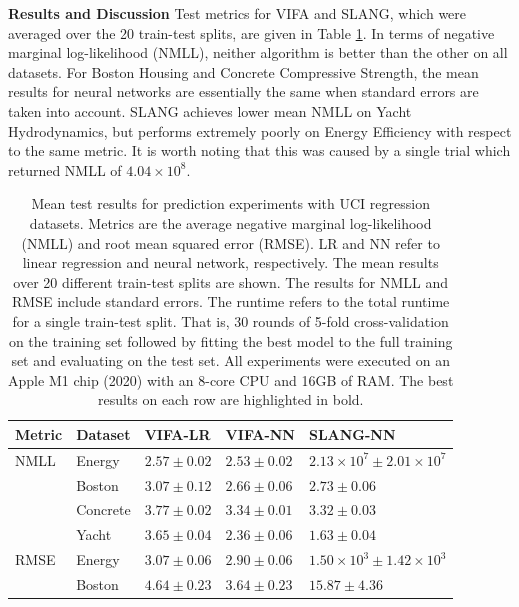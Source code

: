 \documentclass[10pt]{article} %
\begin{document}
\textbf{ Results and Discussion} Test metrics for VIFA and SLANG, which were averaged over the 20 train-test splits, are given in Table \ref{table:neural_nets_uci_mean}. In terms of negative marginal log-likelihood (NMLL), neither algorithm is better than the other on all datasets. For Boston Housing and Concrete Compressive Strength, the mean results for neural networks are essentially the same when standard errors are taken into account. SLANG achieves lower mean NMLL on Yacht Hydrodynamics, but performs extremely poorly on Energy Efficiency with respect to the same metric. It is worth noting that this was caused by a single trial which returned NMLL of $4.04 \times 10^{8}$. 

\begin{table}[!h]
\caption{Mean test results for prediction experiments with UCI regression datasets. Metrics are the average negative marginal log-likelihood (NMLL) and root mean squared error (RMSE). LR and NN refer to linear regression and neural network, respectively. The  mean results over 20 different train-test splits are shown. The results for NMLL and RMSE include standard errors. The runtime refers to the total runtime for a single train-test split. That is, 30 rounds of 5-fold cross-validation on the training set followed by fitting the best model to the full training set and evaluating on the test set. All experiments were executed on an Apple M1 chip (2020) with an 8-core CPU and 16GB of RAM. The best results on each row are highlighted in bold.}
\label{table:neural_nets_uci_mean}
\begin{center}
\begin{tabular}{lllll}
\textbf{Metric}  & \textbf{Dataset}  & \textbf{VIFA-LR} & \textbf{VIFA-NN} & \textbf{SLANG-NN} \\ \hline
NMLL 	& Energy 		& $\mathbf{2.57 \pm 0.02}$ 	& $\mathbf{2.53 \pm            0.02}$ 	& $2.13 \times 10^{7} \pm 2.01 \times 10^{7}$ \\ 	
		& Boston   	& $3.07 \pm 0.12$			& $\mathbf{2.66 \pm 0.06}$ 	& $\mathbf{2.73 \pm 0.06}$ \\ 			
		& Concrete	& $3.77 \pm 0.02$ 			& $\mathbf{3.34 \pm 0.01}$ 	& $\mathbf{3.32 \pm 0.03}$ \\ 			
 	& Yacht    		& $3.65 \pm 0.04$ 			& $2.36 \pm 0.06$ 			& $\mathbf{1.63 \pm 0.04}$ \\ \hline
RMSE 	& Energy 	 	& $3.07 \pm 0.06$  			& $\mathbf{2.90 \pm 0.06}$ 	& $1.50 \times 10^{3} \pm 1.42 \times 10^{3}$ \\ 
		& Boston 	 	& $4.64 \pm 0.23$ 			& $\mathbf{3.64 \pm 0.23}$ 	& $15.87 \pm 4.36$ \\ 

\end{tabular}
\end{center}
\end{table}
\end{document}
